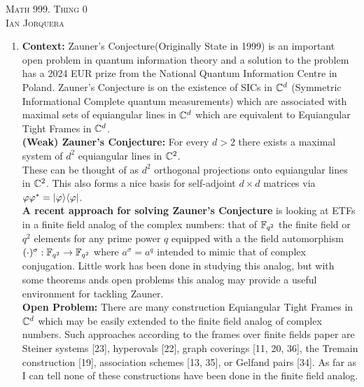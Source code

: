 \documentclass[12pt]{amsart}
\DeclarePairedDelimiter\bra{\langle}{\rvert}
\DeclarePairedDelimiter\ket{\lvert}{\rangle}
\begin{document}
\begin{center}
    \textsc{Math 999. Thing 0\\ Ian Jorquera}
\end{center}
\vspace{1em}

\begin{enumerate}
    \item \textbf{Context:} Zauner's Conjecture(Originally State in 1999) is 
    an important open problem in quantum information theory and a solution to the problem 
    has a 2024 EUR prize from the National Quantum Information Centre in Poland.
    Zauner's Conjecture is on the existence of SICs in $\mathbb{C}^d$ (Symmetric Informational 
    Complete quantum measurements) which are associated with maximal sets of equiangular 
    lines in $\mathbb{C}^d$ which are equivalent to Equiangular Tight Frames in $\mathbb{C}^d$.\\


    \noindent\textbf{(Weak) Zauner's Conjecture:} For every $d>2$ there exists a maximal system of 
    $d^2$ equiangular lines in $\mathbb{C}^2$. \\


    \noindent These can be thought of as $d^2$ orthogonal projections onto equiangular lines in $\mathbb{C}^2$.
    This also forms a nice basis for self-adjoint $d\times d$ matrices via $\phi\phi^*=\ket{\phi}\bra{\phi}$.\\


    \noindent\textbf{A recent approach for solving Zauner's Conjecture} is looking at 
    ETFs in a finite field analog of the complex numbers: that of $\mathbb{F}_{q^2}$ the finite 
    field or $q^2$ elements for any prime power $q$ equipped with a the field 
    automorphism $(\cdot)^\sigma:\mathbb{F}_{q^2}\rightarrow \mathbb{F}_{q^2}$ where $a^\sigma=a^q$ 
    intended to mimic that of complex conjugation. Little work has been done 
    in studying this analog, but with some theorems ands open problems this analog
    may provide a useful environment for tackling Zauner.\\


    \noindent\textbf{Open Problem:} There are many construction Equiangular Tight Frames in $\mathbb{C}^d$ which
    may be easily extended to the finite field analog of complex numbers.
    Such approaches according to the frames over finite fields paper are 
    Steiner systems [23], hyperovals [22], graph coverings [11, 20, 36], 
    the Tremain construction [19], association schemes [13, 35], or Gelfand pairs [34]. 
    As far as I can tell none of these constructions have been done in the finite field analog.


\end{enumerate}
\end{document}
